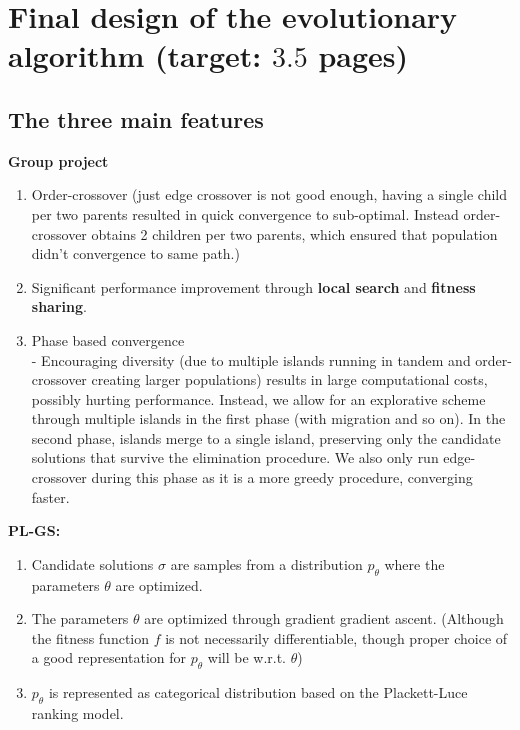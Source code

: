 \documentclass[a4paper,10pt]{article}
\def\retake{0}
\newcommand{\switch}[2]{\ifnum\retake=0{#1}\else{#2}\fi}
\newcommand{\ReplaceMe}[1]{{\color{blue}#1}}
\newcommand{\RemoveMe}[1]{{\color{purple}#1}}
\begin{document}
\section{Final design of the evolutionary algorithm (target: $3.5$ pages)} 


\subsection{The three main features}


\textbf{Group project}
	\begin{enumerate}
	\item Order-crossover (just edge crossover is not good enough, having a single child per two parents resulted in quick convergence to sub-optimal. Instead order-crossover obtains 2 children per two parents, which ensured that population didn't convergence to same path.)
	\item Significant performance improvement through \textbf{local search} and \textbf{fitness sharing}.
	\item Phase based convergence \\
		- Encouraging diversity (due to multiple islands running in tandem and order-crossover creating larger populations) results in large computational costs, possibly hurting performance. Instead, we allow for an explorative scheme through multiple islands in the first phase (with migration and so on). In the second phase, islands merge to a single island, preserving only the candidate solutions that survive the elimination procedure. We also only run edge-crossover during this phase as it is a more greedy procedure, converging faster.
	\end{enumerate}


\textbf{PL-GS:}
	\begin{enumerate}
	 \item Candidate solutions $\sigma$ are samples from a distribution $p_\theta$ where the parameters $\theta$ are optimized.
	 \item The parameters $\theta$ are optimized through gradient gradient ascent. (Although the fitness function $f$ is not necessarily differentiable, though proper choice of a good representation for $p_\theta$ will be w.r.t. $\theta$)
	 \item $p_\theta$ is represented as categorical distribution based on the Plackett-Luce ranking model.
	\end{enumerate}
\end{document}
